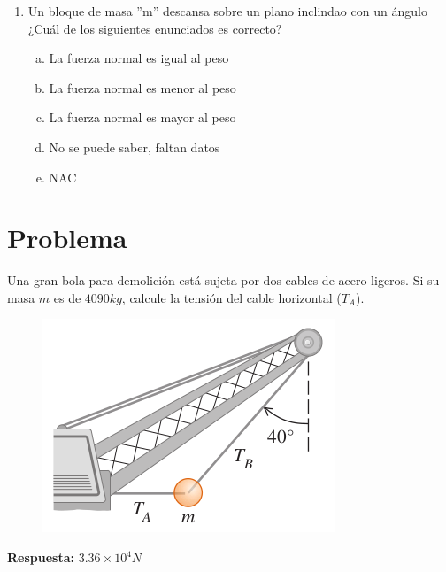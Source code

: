 \begin{multicols}{2}
\begin{enumerate}
	
	
	\item Un bloque de masa ”m” descansa sobre un plano inclindao con un ángulo  ¿Cuál de los siguientes enunciados es correcto?
	\begin{enumerate}[a)]
		\item La fuerza normal es igual al peso
		\item \colorbox[rgb]{1,1,0}{La fuerza normal es menor al peso}
		\item La fuerza normal es mayor al peso
		\item No se puede saber, faltan datos
		\item NAC
	\end{enumerate}
	
	
	
\end{enumerate}
\end{multicols}



\pagebreak

\section*{Problema}
Una gran bola para demolición está sujeta por dos cables de acero ligeros. Si su masa $m$ es de $4090 kg$, calcule la tensión del cable horizontal ($T_A$).

\begin{figure}[H]
	\centering
	\includegraphics[scale=0.5]{./img/bola.png}
\end{figure}

\vspace{1cm}

\textbf{Respuesta: } \colorbox[rgb]{1,1,0}{$3.36\times 10^{4} N$}























